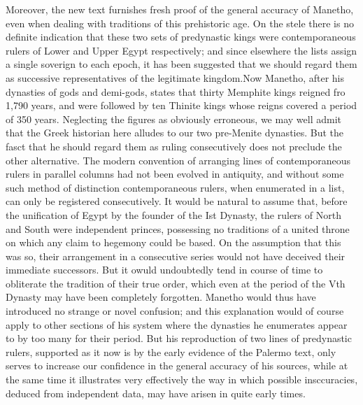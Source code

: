 \documentclass[12pt,oneside]{book}
\begin{document}
Moreover, the new text furnishes fresh proof of the general accuracy of Manetho, even when dealing with traditions of this prehistoric age. On the stele there is no definite indication that these two sets of predynastic kings were contemporaneous rulers of Lower and Upper Egypt respectively; and since elsewhere the lists assign a single soverign to each epoch, it has been suggested that we should regard them as successive representatives of the legitimate kingdom.\footnotemark Now Manetho, after his dynasties of gods and demi-gods, states that thirty Memphite kings reigned fro 1,790 years, and were followed by ten Thinite kings whose reigns covered a period of 350 years. Neglecting the figures as obviously erroneous, we may well admit that the Greek historian here alludes to our two pre-Menite dynasties. But the fasct that he should regard them as ruling consecutively does not preclude the other alternative. The modern convention of arranging lines of contemporaneous rulers in parallel columns had not been evolved in antiquity, and without some such method of distinction contemporaneous rulers, when enumerated in a list, can only be registered consecutively. It would be natural to assume that, before the unification of Egypt by the founder of the Ist Dynasty, the rulers of North and South were independent princes, possessing no traditions of a united throne on which any claim to hegemony could be based. On the assumption that this was so, their arrangement in a consecutive series would not have deceived their immediate successors. But it owuld undoubtedly tend in course of time to obliterate the tradition of their true order, which even at the period of the Vth Dynasty may have been completely forgotten. Manetho would thus have introduced no strange or novel confusion; and this explanation would of course apply to other sections of his system where the dynasties he enumerates appear to by too many for their period. But his reproduction of two lines of predynastic rulers, supported as it now is by the early evidence of the Palermo text, only serves to increase our confidence in the general accuracy of his sources, while at the same time it illustrates very effectively the way in which possible insccuracies, deduced from independent data, may have arisen in quite early times. \par 

\end{document}

